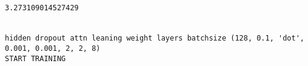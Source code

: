 \documentclass[11pt]{article}
\begin{document}
    \begin{center}
    \end{center}
    { \hspace*{\fill} \\}
    
    \begin{center}
    \end{center}
    { \hspace*{\fill} \\}
    
    \begin{center}
    \end{center}
    { \hspace*{\fill} \\}
    
    \begin{center}
    \end{center}
    { \hspace*{\fill} \\}
    
    \begin{Verbatim}[commandchars=\\\{\}]
3.273109014527429


hidden dropout attn leaning weight layers batchsize (128, 0.1, 'dot', 0.001, 0.001, 2, 2, 8)
START TRAINING



    \end{Verbatim}

    \begin{center}
    \end{center}
    { \hspace*{\fill} \\}
    
    \begin{center}
    \end{center}
    { \hspace*{\fill} \\}
    
    \begin{center}
    \end{center}
    { \hspace*{\fill} \\}
    
\end{document}

